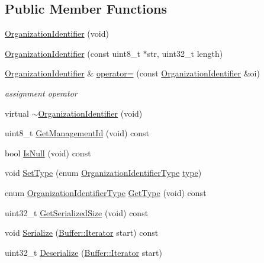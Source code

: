 \subsection*{Public Member Functions}
\begin{DoxyCompactItemize}
\item 
\hyperlink{classns3_1_1OrganizationIdentifier_a579a99598db50ed0dc750cf4e04b3e15}{Organization\+Identifier} (void)
\item 
\hyperlink{classns3_1_1OrganizationIdentifier_ab0b700b0ce7075baa992100ea7e746ae}{Organization\+Identifier} (const uint8\+\_\+t $\ast$str, uint32\+\_\+t length)
\item 
\hyperlink{classns3_1_1OrganizationIdentifier}{Organization\+Identifier} \& \hyperlink{classns3_1_1OrganizationIdentifier_a3585dcb9c8542dde68a33a51526b242d}{operator=} (const \hyperlink{classns3_1_1OrganizationIdentifier}{Organization\+Identifier} \&oi)
\begin{DoxyCompactList}\small\item\em assignment operator \end{DoxyCompactList}\item 
virtual \hyperlink{classns3_1_1OrganizationIdentifier_a667843347fa303a8e1a280861e965531}{$\sim$\+Organization\+Identifier} (void)
\item 
uint8\+\_\+t \hyperlink{classns3_1_1OrganizationIdentifier_abdbf7d8cf53a4550068edcb2f530c866}{Get\+Management\+Id} (void) const 
\item 
bool \hyperlink{classns3_1_1OrganizationIdentifier_a40c43d904d972875133a53eda72ce00e}{Is\+Null} (void) const 
\item 
void \hyperlink{classns3_1_1OrganizationIdentifier_afe3cbf4201bf3f73864deb00b984dc9e}{Set\+Type} (enum \hyperlink{classns3_1_1OrganizationIdentifier_a196c774c611f936ef8b7d2a760ff5ba2}{Organization\+Identifier\+Type} \hyperlink{visualizer-ideas_8txt_add98db9e15e2a58cf2b57623e7aa893a}{type})
\item 
enum \hyperlink{classns3_1_1OrganizationIdentifier_a196c774c611f936ef8b7d2a760ff5ba2}{Organization\+Identifier\+Type} \hyperlink{classns3_1_1OrganizationIdentifier_a241971e71f8206fbee70e013604c439d}{Get\+Type} (void) const 
\item 
uint32\+\_\+t \hyperlink{classns3_1_1OrganizationIdentifier_a8892f67ae5ec4a5b6370cc9d551823c9}{Get\+Serialized\+Size} (void) const 
\item 
void \hyperlink{classns3_1_1OrganizationIdentifier_aff4872730b3c9c624572a17a0a824021}{Serialize} (\hyperlink{classns3_1_1Buffer_1_1Iterator}{Buffer\+::\+Iterator} start) const 
\item 
uint32\+\_\+t \hyperlink{classns3_1_1OrganizationIdentifier_a9f42c40d01c68a5a4657af828225bce2}{Deserialize} (\hyperlink{classns3_1_1Buffer_1_1Iterator}{Buffer\+::\+Iterator} start)
\end{DoxyCompactItemize}
